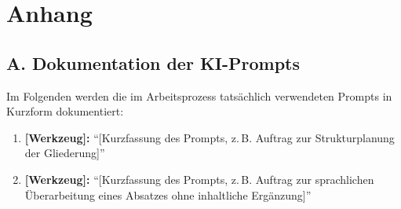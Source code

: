 \section*{Anhang}

\subsection*{A. Dokumentation der KI-Prompts}

Im Folgenden werden die im Arbeitsprozess tatsächlich verwendeten Prompts in
Kurzform dokumentiert:

\begin{enumerate}
  \item \textbf{[Werkzeug]:} \enquote{[Kurzfassung des Prompts, z.\,B. Auftrag
        zur Strukturplanung der Gliederung]}
  \item \textbf{[Werkzeug]:} \enquote{[Kurzfassung des Prompts, z.\,B. Auftrag
        zur sprachlichen Überarbeitung eines Absatzes ohne inhaltliche
        Ergänzung]}
\end{enumerate}

